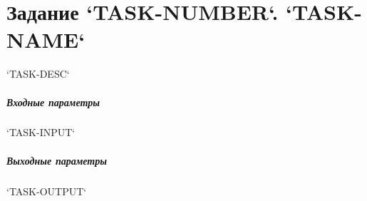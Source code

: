 \chapter*{Задание `TASK-NUMBER`. `TASK-NAME`}

`TASK-DESC`

\paragraph{Входные параметры}

`TASK-INPUT`

\paragraph{Выходные параметры}

`TASK-OUTPUT`
\\
